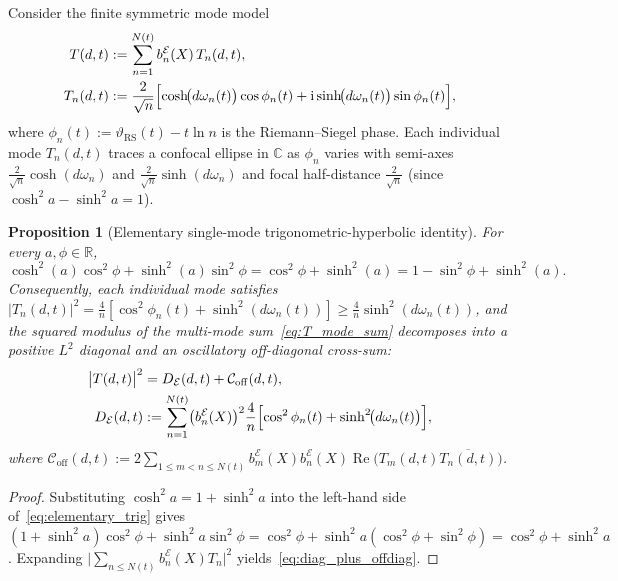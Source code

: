 \documentclass[11pt,reqno]{amsart}
\theoremstyle{plain}
\newtheorem{proposition}[theorem]{Proposition}
\theoremstyle{definition}
\theoremstyle{remark}
\numberwithin{equation}{section}
\newcommand{\ii}{\mathrm{i}}
\DeclareMathOperator{\Reop}{Re}
\begin{document}
Consider the finite symmetric mode model
\begin{equation}\label{eq:T_mode_sum}
\begin{aligned}
T(d,t) &:= \sum_{n=1}^{N(t)} b_n^{\mathcal{E}}(X)\,T_n(d,t), \\
T_n(d,t) &:= \frac{2}{\sqrt{n}}\Bigl[\cosh\!\bigl(d\omega_n(t)\bigr)\cos\phi_n(t) + \ii\sinh\!\bigl(d\omega_n(t)\bigr)\sin\phi_n(t)\Bigr],
\end{aligned}
\end{equation}
where $\phi_n(t) := \vartheta_{\mathrm{RS}}(t) - t\ln n$ is the Riemann--Siegel phase. Each individual mode $T_n(d,t)$ traces a confocal ellipse in $\mathbb{C}$ as $\phi_n$ varies with semi-axes $\frac{2}{\sqrt{n}}\cosh(d\omega_n)$ and $\frac{2}{\sqrt{n}}\sinh(d\omega_n)$ and focal half-distance $\frac{2}{\sqrt{n}}$ (since $\cosh^2 a - \sinh^2 a = 1$).

\begin{proposition}[Elementary single-mode trigonometric-hyperbolic identity]\label{prop:ellipse_mode}
For every $a, \phi \in \mathbb{R}$,
\begin{equation}\label{eq:elementary_trig}
\cosh^2(a)\cos^2\phi + \sinh^2(a)\sin^2\phi = \cos^2\phi + \sinh^2(a) = 1 - \sin^2\phi + \sinh^2(a).
\end{equation}
Consequently, each individual mode satisfies $\lvert T_n(d,t)\rvert^2 = \frac{4}{n}[\cos^2\phi_n(t) + \sinh^2(d\omega_n(t))] \ge \frac{4}{n}\sinh^2(d\omega_n(t))$, and the squared modulus of the multi-mode sum~\eqref{eq:T_mode_sum} decomposes into a positive $L^2$ diagonal and an oscillatory off-diagonal cross-sum:
\begin{equation}\label{eq:diag_plus_offdiag}
\begin{aligned}
\bigl\lvert T(d,t)\bigr\rvert^2 &= D_{\mathcal{E}}(d,t) + \mathcal{C}_{\mathrm{off}}(d,t), \\
D_{\mathcal{E}}(d,t) &:= \sum_{n=1}^{N(t)} \bigl(b_n^{\mathcal{E}}(X)\bigr)^2 \frac{4}{n}\Bigl[\cos^2\phi_n(t) + \sinh^2\!\bigl(d\omega_n(t)\bigr)\Bigr],
\end{aligned}
\end{equation}
where $\mathcal{C}_{\mathrm{off}}(d,t) := 2\sum_{1 \le m < n \le N(t)} b_m^{\mathcal{E}}(X)b_n^{\mathcal{E}}(X)\Reop\bigl(T_m(d,t)\overline{T_n(d,t)}\bigr)$.
\end{proposition}

\begin{proof}
Substituting $\cosh^2 a = 1 + \sinh^2 a$ into the left-hand side of~\eqref{eq:elementary_trig} gives $(1 + \sinh^2 a)\cos^2\phi + \sinh^2 a\sin^2\phi = \cos^2\phi + \sinh^2 a(\cos^2\phi + \sin^2\phi) = \cos^2\phi + \sinh^2 a$. Expanding $\lvert\sum_{n \le N(t)} b_n^{\mathcal{E}}(X)T_n\rvert^2$ yields~\eqref{eq:diag_plus_offdiag}.
\end{proof}
\end{document}
